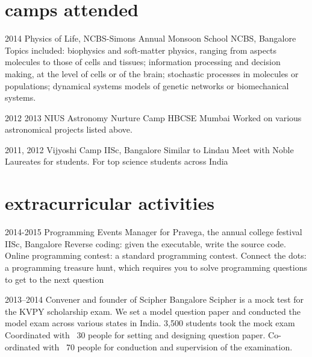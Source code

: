 \documentclass[11pt]{friggeri-cv}
\begin{document}
\section{camps attended}

\begin{entrylist}
  \entryy
    {2014}
    {Physics of Life, NCBS-Simons Annual Monsoon School}
    {NCBS, Bangalore}
    {Topics included: biophysics and soft-matter physics, ranging from aspects molecules to those of cells and tissues; information processing and decision making, at the level of cells or of the brain; stochastic processes in molecules or populations; dynamical systems models of genetic networks or biomechanical systems.}
    
\end{entrylist}


\begin{entrylist}
  \entryy
    {2012 2013}
    {NIUS Astronomy Nurture Camp}
    {HBCSE Mumbai}
    {Worked on various astronomical projects listed above.}
\end{entrylist}


\begin{entrylist}
  \entryy
    {2011, 2012}
    {Vijyoshi Camp}
    {IISc, Bangalore}
    {Similar to Lindau Meet with Noble Laureates for students. For top  science students across India }
    
\end{entrylist}









\section{extracurricular activities}

\begin{entrylist}
  \entryy
    {2014-2015}
    {Programming Events Manager for Pravega, the annual college festival}
    {IISc, Bangalore}
    {Reverse coding: given the executable, write the source code. Online programming contest: a standard programming contest. Connect the dots: a programming treasure hunt, which requires you to solve programming questions to get to the next question}
\end{entrylist}

\begin{entrylist}
  \entryy
    {2013--2014}
    {Convener and founder of Scipher}
    {Bangalore}
    {Scipher is a mock test for the KVPY scholarship exam. We set a model question paper and conducted the model exam across various states in India. 3,500 students took the mock exam Coordinated with ~30 people for setting and designing question paper. Co-ordinated with ~70 people for conduction and supervision of the examination.}
\end{entrylist}
\end{document}
